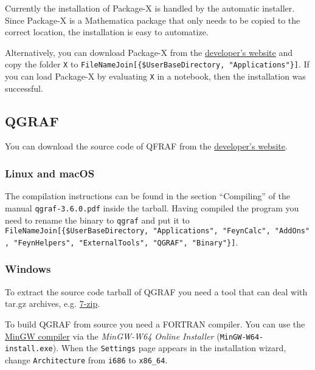 \documentclass[../FeynHelpersManual.tex]{subfiles}
\begin{document}
Currently the installation of Package-X is handled by the automatic
installer. Since Package-X is a Mathematica package that only needs to
be copied to the correct location, the installation is easy to
automatize.

Alternatively, you can download Package-X from the
\href{https://packagex.hepforge.org/}{developer's website} and copy the
folder \texttt{X} to
\texttt{FileNameJoin[\allowbreak{}\{\allowbreak{}\$UserBaseDirectory,\ \allowbreak{}"Applications"\}]}.
If you can load Package-X by evaluating \texttt{X\textasciigrave } in a
notebook, then the installation was successful.

\hypertarget{qgraf}{%
\subsection{QGRAF}\label{qgraf}}

You can download the source code of QFRAF from the
\href{http://cfif.ist.utl.pt/~paulo/qgraf.html}{developer's website}.

\hypertarget{linux-and-macos}{%
\subsubsection{Linux and macOS}\label{linux-and-macos}}

The compilation instructions can be found in the section ``Compiling''
of the manual \texttt{qgraf-3.6.0.pdf} inside the tarball. Having
compiled the program you need to rename the binary to \texttt{qgraf} and
put it to
\texttt{FileNameJoin[\allowbreak{}\{\allowbreak{}\$UserBaseDirectory,\ \allowbreak{}"Applications",\ \allowbreak{}"FeynCalc",\ \allowbreak{}"AddOns",\ \allowbreak{}"FeynHelpers",\ \allowbreak{}"ExternalTools",\ \allowbreak{}"QGRAF",\ \allowbreak{}"Binary"\}]}.

\hypertarget{windows-4}{%
\subsubsection{Windows}\label{windows-4}}

To extract the source code tarball of QGRAF you need a tool that can
deal with tar.gz archives, e.g. \href{https://www.7-zip.org/}{7-zip}.

To build QGRAF from source you need a FORTRAN compiler. You can use the
\href{https://sourceforge.net/projects/mingw-w64/files/mingw-w64}{MinGW
compiler} via the \emph{MinGW-W64 Online Installer}
(\texttt{MinGW-W64-install.exe}). When the \texttt{Settings} page
appears in the installation wizard, change \texttt{Architecture} from
\texttt{i686} to \texttt{x86_64}.
\end{document}
